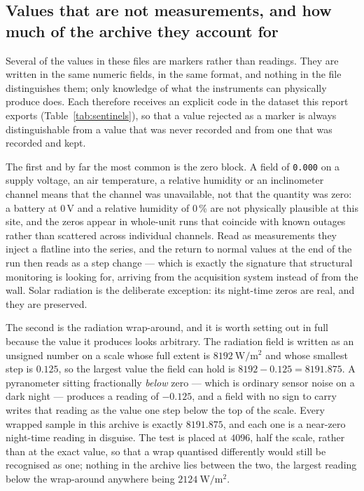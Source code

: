 \documentclass[11pt,a4paper]{article}
\begin{document}
\subsection{Values that are not measurements, and how much of the archive they account for}
\label{sec:census}

Several of the values in these files are markers rather than readings. They are written in the same numeric fields, in the same format, and nothing in the file distinguishes them; only knowledge of what the instruments can physically produce does. Each therefore receives an explicit code in the dataset this report exports (Table~\ref{tab:sentinels}), so that a value rejected as a marker is always distinguishable from a value that was never recorded and from one that was recorded and kept.

The first and by far the most common is the zero block. A field of \texttt{0.000} on a supply voltage, an air temperature, a relative humidity or an inclinometer channel means that the channel was unavailable, not that the quantity was zero: a battery at $0$\,V and a relative humidity of $0$\,\% are not physically plausible at this site, and the zeros appear in whole-unit runs that coincide with known outages rather than scattered across individual channels. Read as measurements they inject a flatline into the series, and the return to normal values at the end of the run then reads as a step change --- which is exactly the signature that structural monitoring is looking for, arriving from the acquisition system instead of from the wall. Solar radiation is the deliberate exception: its night-time zeros are real, and they are preserved.

The second is the radiation wrap-around, and it is worth setting out in full because the value it produces looks arbitrary. The radiation field is written as an unsigned number on a scale whose full extent is $8192\ \mathrm{W/m^2}$ and whose smallest step is $0.125$, so the largest value the field can hold is $8192 - 0.125 = 8191.875$. A pyranometer sitting fractionally \emph{below} zero --- which is ordinary sensor noise on a dark night --- produces a reading of $-0.125$, and a field with no sign to carry writes that reading as the value one step below the top of the scale. Every wrapped sample in this archive is exactly $8191.875$, and each one is a near-zero night-time reading in disguise. The test is placed at $4096$, half the scale, rather than at the exact value, so that a wrap quantised differently would still be recognised as one; nothing in the archive lies between the two, the largest reading below the wrap-around anywhere being $2124\ \mathrm{W/m^2}$.
\end{document}

